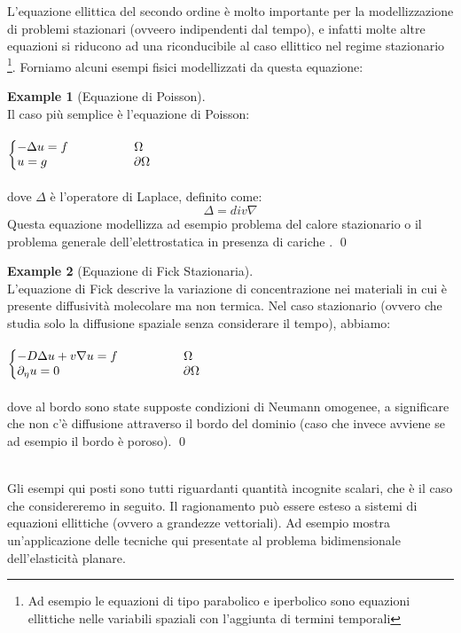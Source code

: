 \documentclass[12pt,a4paper]{report}
\makeatletter
\theoremstyle{theorem}
\theoremstyle{theorem}
\theoremstyle{definition}
\newtheorem{example}{Example}
\newenvironment{system}
{\left\lbrace\begin{array}{@{}l@{}}}
{\end{array}\right.}
\makeatother
\begin{document}
L'equazione ellittica del secondo ordine è molto importante per la modellizzazione di problemi stazionari (ovveero indipendenti dal tempo), e infatti molte altre equazioni si riducono ad una riconducibile al caso ellittico nel regime stazionario \footnote{Ad esempio le equazioni di tipo parabolico e iperbolico sono equazioni ellittiche nelle variabili spaziali con l'aggiunta di termini temporali}. Forniamo alcuni esempi fisici modellizzati da questa equazione:
\begin{example} [Equazione di Poisson]
\hfill \\
Il caso più semplice è l'equazione di Poisson:\\\\
\begin{math}
\begin{system}
- \Delta u = f \qquad \qquad \quad \ \Omega \\
u = g \qquad \qquad \qquad \quad \partial \Omega \\
\end{system}
\end{math}
\hfill \\\\
dove $\Delta$ è l'operatore di Laplace, definito come:
\[ \Delta = div \nabla \]
Questa equazione modellizza ad esempio problema del calore stazionario \cite[Capitolo~3]{Salsa} o il problema generale dell'elettrostatica in presenza di cariche \cite[Capitoli~1,2,3]{Jackson}.
\qed
\end{example}
\begin{example} [Equazione di Fick Stazionaria]
\hfill \\
L'equazione di Fick descrive la variazione di concentrazione nei materiali in cui è presente diffusività molecolare ma non termica. Nel caso stazionario (ovvero che studia solo la diffusione spaziale senza considerare il tempo), abbiamo:\\\\
\begin{math}
\begin{system}
- D\Delta u + v \nabla u = f \qquad \qquad \quad \ \Omega \\
\partial_{\eta} u = 0 \quad \qquad \qquad \qquad \qquad \quad \partial \Omega \\
\end{system}
\end{math}
\hfill \\\\
dove al bordo sono state supposte condizioni di Neumann omogenee, a significare che non c'è diffusione attraverso il bordo del dominio (caso che invece avviene se ad esempio il bordo è poroso).
\qed
\end{example}
\hfill \\
Gli esempi qui posti sono tutti riguardanti quantità incognite scalari, che è il caso che considereremo in seguito. Il ragionamento può essere esteso a sistemi di equazioni ellittiche (ovvero a grandezze vettoriali). Ad esempio \cite[Capitolo~11]{BS} mostra un'applicazione delle tecniche qui presentate al problema bidimensionale dell'elasticità planare. \\
\end{document}
